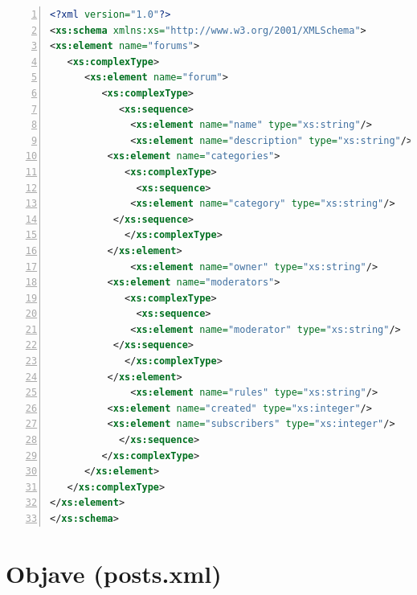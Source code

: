 \documentclass{foi}
\begin{document}
\begin{lstlisting}[language=XML, numbers=left, caption=XML Schema za dokument "forums.xml", captionpos=b]
 <?xml version="1.0"?>
<xs:schema xmlns:xs="http://www.w3.org/2001/XMLSchema">
<xs:element name="forums">
   <xs:complexType>
      <xs:element name="forum">
         <xs:complexType>
            <xs:sequence>
              <xs:element name="name" type="xs:string"/>
              <xs:element name="description" type="xs:string"/>
	      <xs:element name="categories">
	         <xs:complexType>
	           <xs:sequence>
		      <xs:element name="category" type="xs:string"/>
		   </xs:sequence>
	         </xs:complexType>
	      </xs:element>
              <xs:element name="owner" type="xs:string"/>
	      <xs:element name="moderators">
	         <xs:complexType>
	           <xs:sequence>
		      <xs:element name="moderator" type="xs:string"/>
		   </xs:sequence>
	         </xs:complexType>
	      </xs:element>
              <xs:element name="rules" type="xs:string"/>
	      <xs:element name="created" type="xs:integer"/>
	      <xs:element name="subscribers" type="xs:integer"/>
            </xs:sequence>
         </xs:complexType>
      </xs:element>
   </xs:complexType>
</xs:element>
</xs:schema> 
\end{lstlisting}

\section{Objave (posts.xml)}
\end{document}
